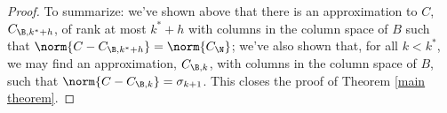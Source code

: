 \begin{proof}
\noindent To summarize: we've shown above that there is an approximation to $C$, $C_{\B, k^* + h}$, of rank at most $k^* + h$ with columns in the column space of $B$ such that $\norm{C - C_{\B, k^* + h}} = \norm{C_{\N}}$; we've also shown that, for all $k < k^*$, we may find an approximation, $C_{\B, k}$, with columns in the column space of $B$, such that $\norm{C - C_{\B, k}} = \sigma_{k+1}$. This closes the proof of Theorem \ref{main theorem}.
\end{proof}